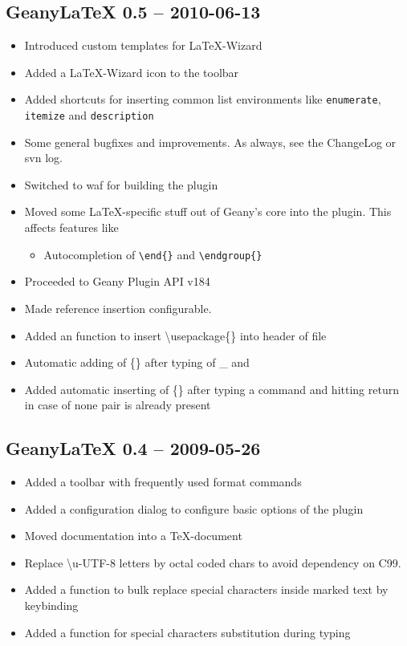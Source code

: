 \documentclass[%
paper=a4,%
fontsize=11pt,%
twoside=false,%
DIV18,%
headsepline,%
plainheadsepline,%
footsepline,%
plainfootsepline,%
bibliography=totoc,%
listof=totoc,%
BCOR10mm,%
parskip=half,%
openany,%
]{scrreprt}
\begin{document}
\subsection{Geany\LaTeX{} 0.5 -- 2010-06-13}
\begin{itemize}
    \item Introduced custom templates for \LaTeX-Wizard
    \item Added a \LaTeX-Wizard icon to the toolbar
    \item Added shortcuts for inserting common list environments
          like \texttt{enumerate}, \texttt{itemize} and
          \texttt{description}
    \item Some general bugfixes and improvements. As always, see the
          ChangeLog or svn log.
    \item Switched to waf for building the plugin
    \item Moved some \LaTeX{}-specific stuff out of Geany's core into the
          plugin. This affects features like
            \begin{itemize}
                \item Autocompletion of \texttt{\textbackslash{}end\{\}}
                    and \texttt{\textbackslash{}endgroup\{\}}
            \end{itemize}
    \item Proceeded to Geany Plugin API v184
    \item Made reference insertion configurable.
    \item Added an function to insert \textbackslash{}usepackage\{\} into
          header of file
    \item Automatic adding of \{\} after typing of \_{} and 
    \item Added automatic inserting of \{\} after typing a command and
          hitting return in case of none pair is already present
\end{itemize}

\subsection{Geany\LaTeX{} 0.4 -- 2009-05-26}
\begin{itemize}
    \item Added a toolbar with frequently used format commands
    \item Added a configuration dialog to configure basic options
          of the plugin
    \item Moved documentation into a \TeX{}-document
    \item Replace \textbackslash{}u-UTF-8 letters by octal coded
          chars to avoid dependency on C99.
    \item Added a function to bulk replace special characters
          inside marked text by keybinding
    \item Added a function for special characters substitution during typing
\end{itemize}
\end{document}
